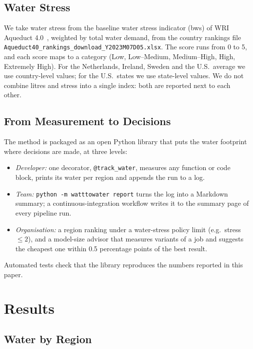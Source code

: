 \documentclass[conference]{IEEEtran}
\begin{document}
\subsection{Water Stress}

We take water stress from the baseline water stress indicator (bws) of WRI Aqueduct 4.0~\cite{wri2023aqueduct}, weighted by total water demand, from the country rankings file \texttt{Aqueduct40\_rankings\_download\_Y2023M07D05.xlsx}. The score runs from 0 to 5, and each score maps to a category (Low, Low--Medium, Medium--High, High, Extremely High). For the Netherlands, Ireland, Sweden and the U.S.\ average we use country-level values; for the U.S.\ states we use state-level values. We do not combine litres and stress into a single index: both are reported next to each other.

\subsection{From Measurement to Decisions}

The method is packaged as an open Python library that puts the water footprint where decisions are made, at three levels:
\begin{itemize}
\item \textit{Developer:} one decorator, \texttt{@track\_water}, measures any function or code block, prints its water per region and appends the run to a log.
\item \textit{Team:} \texttt{python -m watttowater report} turns the log into a Markdown summary; a continuous-integration workflow writes it to the summary page of every pipeline run.
\item \textit{Organisation:} a region ranking under a water-stress policy limit (e.g.\ stress $\le 2$), and a model-size advisor that measures variants of a job and suggests the cheapest one within 0.5 percentage points of the best result.
\end{itemize}
Automated tests check that the library reproduces the numbers reported in this paper.

\section{Results}

\subsection{Water by Region}
\end{document}
